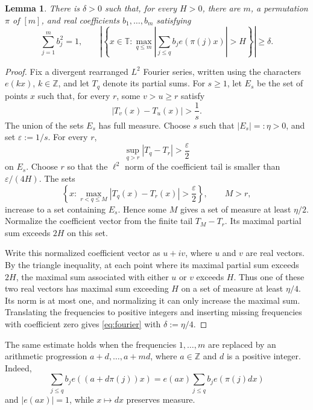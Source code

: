 \documentclass[11pt]{article}
\newtheorem{lemma}[theorem]{Lemma}
\theoremstyle{remark}
\numberwithin{equation}{section}
\newcommand{\T}{\mathbb T}
\newcommand{\Z}{\mathbb Z}
\begin{document}
\begin{lemma}\label{lem:fourier}
There is $\delta>0$ such that, for every $H>0$, there are $m$, a permutation $\pi$ of $[m]$, and real coefficients $b_1,\ldots,b_m$ satisfying
\begin{equation}\label{eq:fourier}
 \sum_{j=1}^m b_j^2=1,\qquad
 \left|\left\{x\in\T:\max_{q\leq m}
 \left|\sum_{j\leq q}b_j e(\pi(j)x)\right|>H\right\}\right|\geq\delta.
\end{equation}
\end{lemma}

\begin{proof}
Fix a divergent rearranged $L^2$ Fourier series, written using the characters $e(kx)$, $k\in\Z$, and let $T_q$ denote its partial sums. For $s\geq1$, let $E_s$ be the set of points $x$ such that, for every $r$, some $v>u\geq r$ satisfy
\[
 |T_v(x)-T_u(x)|>\frac1s.
\]
The union of the sets $E_s$ has full measure. Choose $s$ such that $|E_s|=:\eta>0$, and set $\varepsilon:=1/s$. For every $r$,
\[
 \sup_{q>r}|T_q-T_r|>\frac{\varepsilon}{2}
\]
on $E_s$. Choose $r$ so that the $\ell^2$ norm of the coefficient tail is smaller than $\varepsilon/(4H)$. The sets
\[
 \left\{x:\max_{r<q\leq M}|T_q(x)-T_r(x)|>\frac{\varepsilon}{2}\right\},
 \qquad M>r,
\]
increase to a set containing $E_s$. Hence some $M$ gives a set of measure at least $\eta/2$. Normalize the coefficient vector from the finite tail $T_M-T_r$. Its maximal partial sum exceeds $2H$ on this set.

Write this normalized coefficient vector as $u+iv$, where $u$ and $v$ are real vectors. By the triangle inequality, at each point where its maximal partial sum exceeds $2H$, the maximal sum associated with either $u$ or $v$ exceeds $H$. Thus one of these two real vectors has maximal sum exceeding $H$ on a set of measure at least $\eta/4$. Its norm is at most one, and normalizing it can only increase the maximal sum. Translating the frequencies to positive integers and inserting missing frequencies with coefficient zero gives \eqref{eq:fourier} with $\delta:=\eta/4$.
\end{proof}

The same estimate holds when the frequencies $1,\ldots,m$ are replaced by an arithmetic progression $a+d,\ldots,a+md$, where $a\in\Z$ and $d$ is a positive integer. Indeed,
\begin{equation}\label{eq:affine}
 \sum_{j\leq q}b_j e((a+d\pi(j))x)
 =e(ax)\sum_{j\leq q}b_j e(\pi(j)dx)
\end{equation}
and $|e(ax)|=1$, while $x\mapsto dx$ preserves measure.
\end{document}
